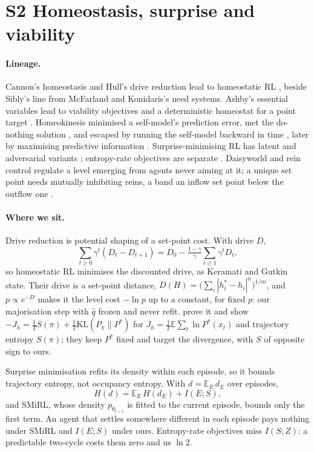 \documentclass[10pt]{article}
\begin{document}
\section{S2 Homeostasis, surprise and viability}

\paragraph{Lineage.}
Cannon's homeostasis \citep{Cannon-organization29} and Hull's drive reduction lead to homeostatic RL \citep{Keramati-homeostatic14}, beside Sibly's line from McFarland and Konidaris's need systems. Ashby's essential variables \citep{Ashby-design52} lead to viability objectives \citep{Massiani-safe23} and a deterministic homeostat for a point target \citep{MorenoBote-homeostasis26}. Homeokinesis minimised a self-model's prediction error, met the do-nothing solution \citep{Der-homeokinesis99}, and escaped by running the self-model backward in time \citep{Der-true02}, later by maximising predictive information \citep{Ay-predictive08}. Surprise-minimising RL \citep{Berseth-smirl21} has latent and adversarial variants \citep{Rhinehart-information21,Fickinger-explore21}; entropy-rate objectives are separate \citep{JarneOrnia-predictable25}. Daisyworld \citep{Watson-biological83} and rein control \citep{Saunders-integral98} regulate a level emerging from agents never aiming at it; a unique set point needs mutually inhibiting reins, a band an inflow set point below the outflow one \citep{Drengstig-basic12}.

\paragraph{Where we sit.}
Drive reduction is potential shaping of a set-point cost. With drive $D$,
\[
\textstyle\sum_{t\ge0}\gamma^t (D_t - D_{t+1}) = D_0 - \tfrac{1-\gamma}{\gamma}\sum_{t\ge1}\gamma^t D_t ,
\]
so homeostatic RL minimises the discounted drive, as Keramati and Gutkin state. Their drive is a set-point distance, $D(H)=\big(\sum_i|h_i^*-h_i|^n\big)^{1/m}$, and $p\propto e^{-D}$ makes it the level cost $-\ln p$ up to a constant, for fixed $p$: our majorisation step with $\hat q$ frozen and never refit. \citet{Yoshida-emergence24} prove it and show $-J_h=\tfrac1T S(\pi)+\tfrac1T\mathrm{KL}(P_\pi\|P^*)$ for $J_h=\tfrac1T\mathbb{E}\sum_t\ln P^*(x_t)$ and trajectory entropy $S(\pi)$; they keep $P^*$ fixed and target the divergence, with $S$ of opposite sign to ours.

Surprise minimisation refits its density within each episode, so it bounds trajectory entropy, not occupancy entropy. With $d = \mathbb{E}_E\, d_E$ over episodes,
\[
H(d) = \mathbb{E}_E\, H(d_E) + I(E;S),
\]
and SMiRL, whose density $p_{\theta_{t-1}}$ is fitted to the current episode, bounds only the first term. An agent that settles somewhere different in each episode pays nothing under SMiRL and $I(E;S)$ under ours. Entropy-rate objectives miss $I(S;Z)$: a predictable two-cycle costs them zero and us $\ln 2$.
\end{document}

